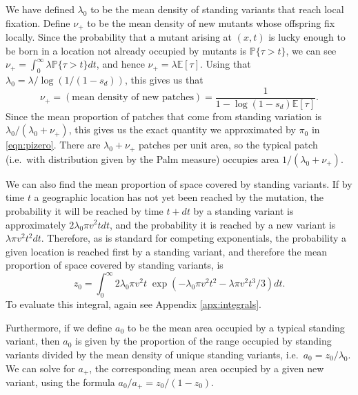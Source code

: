 \documentclass{article}
\renewcommand{\P}{\mathbb{P}}
\newcommand{\E}{\mathbb{E}}
\begin{document}

We have defined $\lambda_0$ to be the mean density of standing variants that reach local fixation.
Define $\nu_+$ to be the mean density of new mutants whose offspring fix locally.
Since the probability that a mutant arising at $(x,t)$ is lucky enough to be born in a location not already occupied by mutants
is $\P\{ \tau > t \}$,
we can see  $\nu_+ = \int_0^\infty \lambda \P\{\tau>t\} dt$, and hence
$\nu_+ = \lambda \E[\tau] $.
Using that $\lambda_0 = \lambda / \log(1/(1-s_d))$, this gives us that
\begin{equation}
    \nu_+ = (\mbox{mean density of new patches}) = \frac{1}{1-\log(1-s_d) \E[\tau]} .
\end{equation}
Since the mean proportion of patches that come from standing variation is $\lambda_0 / (\lambda_0 + \nu_+)$,
this gives us the exact quantity we approximated by $\pi_0$ in \eqref{eqn:pizero}.
There are $\lambda_0 + \nu_+$ patches per unit area, so
the typical patch (i.e.\ with distribution given by the Palm measure) occupies area $1/(\lambda_0 + \nu_+)$.

We can also find the mean proportion of space covered by standing variants.
If by time $t$ a geographic location has not yet been reached by the mutation,
the probability it will be reached by time $t+dt$ 
by a standing variant is approximately $2 \lambda_0 \pi v^2 t dt$, 
and the probability it is reached by a new variant is $\lambda \pi v^2 t^2 dt$.
Therefore, as is standard for competing exponentials,
the probability a given location is reached first by a standing variant,
and therefore the mean proportion of space covered  by standing variants,
is
\begin{equation}
    z_0 = \int_0^\infty {2 \lambda_0 \pi v^2 t} \; \exp \left( - \lambda_0 \pi v^2 t^2 - \lambda \pi v^2 t^3 / 3 \right) dt .
\end{equation}
To evaluate this integral, again see Appendix \ref{apx:integrals}.

Furthermore, if we define $a_0$ to be the mean area occupied by a typical standing variant, 
then $a_0$ is given by the proportion of the range occupied by standing variants divided by the mean density of unique standing variants,
i.e.\ $a_0 = z_0 / \lambda_0$.
We can solve for $a_+$, the corresponding mean area occupied by a given new variant, 
using the formula $a_0 / a_+ = z_0 / (1-z_0)$.
\end{document}
